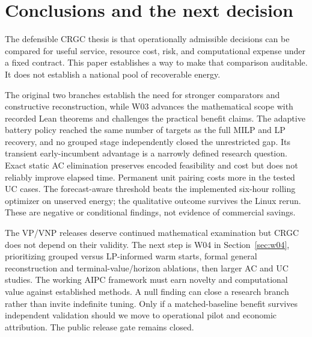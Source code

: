 \documentclass[11pt,letterpaper]{article}
\begin{document}
\section{Conclusions and the next decision}
The defensible CRGC thesis is that operationally admissible decisions can be compared for useful service, resource cost, risk, and computational expense under a fixed contract. This paper establishes a way to make that comparison auditable. It does not establish a national pool of recoverable energy.

The original two branches establish the need for stronger comparators and constructive reconstruction, while W03 advances the mathematical scope with recorded Lean theorems and challenges the practical benefit claims. The adaptive battery policy reached the same number of targets as the full MILP and LP recovery, and no grouped stage independently closed the unrestricted gap. Its transient early-incumbent advantage is a narrowly defined research question. Exact static AC elimination preserves encoded feasibility and cost but does not reliably improve elapsed time. Permanent unit pairing costs more in the tested UC cases. The forecast-aware threshold beats the implemented six-hour rolling optimizer on unserved energy; the qualitative outcome survives the Linux rerun. These are negative or conditional findings, not evidence of commercial savings.

The VP/VNP releases deserve continued mathematical examination but CRGC does not depend on their validity. The next step is W04 in Section~\ref{sec:w04}, prioritizing grouped versus LP-informed warm starts, formal general reconstruction and terminal-value/horizon ablations, then larger AC and UC studies. The working AIPC framework must earn novelty and computational value against established methods. A null finding can close a research branch rather than invite indefinite tuning. Only if a matched-baseline benefit survives independent validation should we move to operational pilot and economic attribution. The public release gate remains closed.

\clearpage
\appendix
\end{document}
